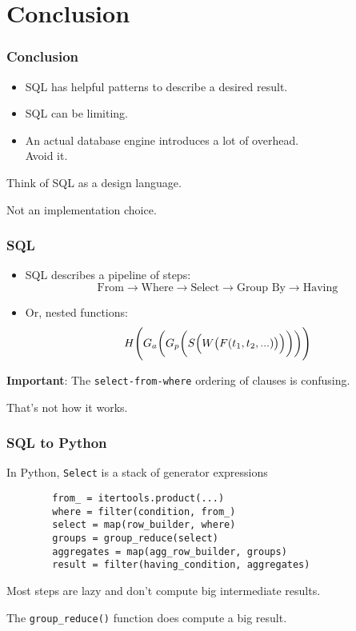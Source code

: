 \documentclass{beamer}
\begin{document}
\section{Conclusion}
\begin{frame}
    \frametitle{Conclusion}

    \begin{itemize}
        \item SQL has helpful patterns to describe a desired result.
        \item SQL can be limiting.
        \item An actual database engine introduces a lot of overhead. \\ Avoid it.
    \end{itemize}
    \vspace{1em}
    Think of SQL as a design language.\pause

    Not an implementation choice.
\end{frame}

\begin{frame}
    \frametitle{SQL}

    \begin{itemize}
        \item SQL describes a pipeline of steps:
        \[
            \textrm{From} \rightarrow \textrm{Where} \rightarrow \textrm{Select} \rightarrow \textrm{Group By} \rightarrow \textrm{Having}
        \]

        \item Or, nested functions:
        \[
            H\Biggl(G_a \biggl (G_p \biggl( S \Bigl(W \bigl( F(t_1, t_2, ...) \bigr) \Bigr) \biggr)\biggr)\Biggr)
        \]

        \end{itemize}

        \vspace{1em}
        \textbf{Important}: The \texttt{select-from-where} ordering of clauses is confusing.

        That's not how it works.

\end{frame}

\begin{frame}[fragile]
    \frametitle{SQL to Python}
    In Python, \texttt{Select} is a stack of generator expressions

    \begin{verbatim}
        from_ = itertools.product(...)
        where = filter(condition, from_)
        select = map(row_builder, where)
        groups = group_reduce(select)
        aggregates = map(agg_row_builder, groups)
        result = filter(having_condition, aggregates)
    \end{verbatim}

    \vspace{1em}
    Most steps are lazy and don't compute big intermediate results. \pause

    The \texttt{group\_reduce()} function does compute a big result.

\end{frame}
\end{document}
